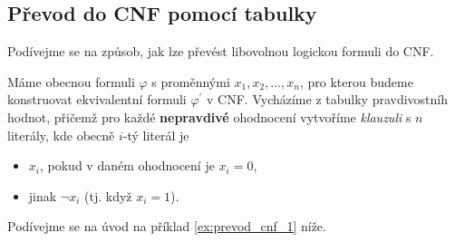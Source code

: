 \subsection{Převod do CNF pomocí tabulky}\label{subsec:cnf_prevod_tabulka}

Podívejme se na způsob, jak lze převést libovolnou logickou formuli do CNF.

Máme obecnou formuli $\varphi$ s proměnnými $x_1,x_2,\dots,x_n$, pro kterou budeme konstruovat ekvivalentní formuli $\varphi^\prime$ v CNF. Vycházíme z tabulky pravdivostníh hodnot, přičemž pro každé \textbf{nepravdivé} ohodnocení vytvoříme \emph{klauzuli} s $n$ literály, kde obecně $i$-tý literál je
\begin{itemize}
    \item $x_i$, pokud v daném ohodnocení je $x_i=0$,
    \item jinak $\neg x_i$ (tj. když $x_i=1$).
\end{itemize}
Podívejme se na úvod na příklad \ref{ex:prevod_cnf_1} níže.

